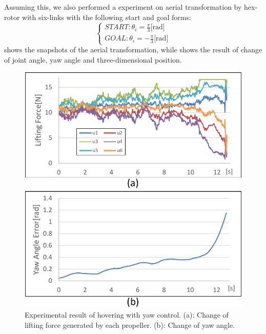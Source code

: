 \par
Assuming this, we also performed a experiment on aerial transformation by hex-rotor with six-links with the following start and goal forms:
\begin{equation}
  \begin{cases}
    START: \theta_i = \frac{\pi}{3}\text{[rad]}\\
    GOAL: \theta_i = -\frac{\pi}{3}\text{[rad]}
  \end{cases}
\end{equation} 
 shows the snapshots of the aerial transformation, while  shows the result of change of joint angle, yaw angle and three-dimensional position. 
\begin{figure}[th]
  \begin{center}
    \includegraphics[width=1.0\columnwidth]{figs/rotate_with_yaw.pdf}
  \end{center}
  \caption{Experimental result of hovering with yaw control. (a): Change of lifting force generated by each propeller. (b): Change of yaw angle. \label{figure:rotate_with_yaw}}
\end{figure}


